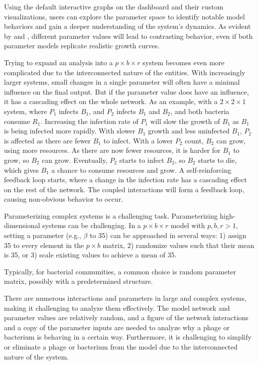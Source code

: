 Using the default interactive graphs on the dashboard and their custom visualizations, users can explore the parameter space to identify notable model behaviors and gain a deeper understanding of the system's dynamics. 
As evident by  and , different parameter values will lead to contrasting behavior, even if both parameter models replicate realistic growth curves. 

Trying to expand an analysis into a $p\times b\times r$ system becomes even more complicated due to the interconnected nature of the entities. 
With increasingly larger systems, small changes in a single parameter will often have a minimal influence on the final output. 
But if the parameter value does have an influence, it has a cascading effect on the whole network. 
As an example, with a $2\times 2\times 1$ system, where $P_1$ infects $B_1$, and $P_2$ infects $B_1$ and $B_2$, and both bacteria consume $R_1$.  
Increasing the infection rate of $P_1$ will slow the growth of $B_1$ as $B_1$ is being infected more rapidly. 
With slower $B_1$ growth and less uninfected $B_1$, $P_2$ is affected as there are fewer $B_1$ to infect. With a lower $P_2$ count, $B_2$ can grow, using more resources. 
As there are now fewer resources, it is harder for $B_1$ to grow, so $B_2$ can grow. 
Eventually, $P_2$ starts to infect $B_2$, so $B_2$ starts to die, which gives $B_1$ a chance to consume resources and grow. 
A self-reinforcing feedback loop starts, where a change in the infection rate has a cascading effect on the rest of the network. 
The coupled interactions will form a feedback loop, causing non-obvious behavior to occur. 

Parameterizing complex systems is a challenging task. 
Parameterizing high-dimensional systems can be challenging. 
In a $p \times b \times r$ model with $p, b, r > 1$, setting a parameter (e.g., $\beta$ to 35) can be approached in several ways: 1) assign 35 to every element in the $p \times b$ matrix, 2) randomize values such that their mean is 35, or 3) scale existing values to achieve a mean of 35.

Typically, for bacterial communities, a common choice is random parameter matrix, possibly with a predetermined structure. 

There are numerous interactions and parameters in large and complex systems, making it challenging to analyze them effectively. 
The model network and parameter values are relatively random, and a figure of the network interactions and a copy of the parameter inputs are needed to analyze why a phage or bacterium is behaving in a certain way. 
Furthermore, it is challenging to simplify or eliminate a phage or bacterium from the model due to the interconnected nature of the system. 


